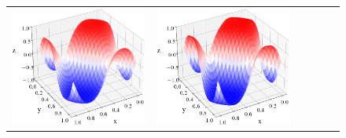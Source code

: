 \documentclass[12pt, reqno]{report}
\theoremstyle{definition}
\theoremstyle{remark}
\begin{document}
\begin{figure}[H]
\begin{tabular}{rccccc}
        \includegraphics[align = c, height=\subheight]{media_paper/AC_surf_FD_n=200.png} &
        \includegraphics[align = c, height=\subheight]{media_paper/AC_surf_FD_n=500.png} &

\end{tabular}
\end{figure}
\end{document}

